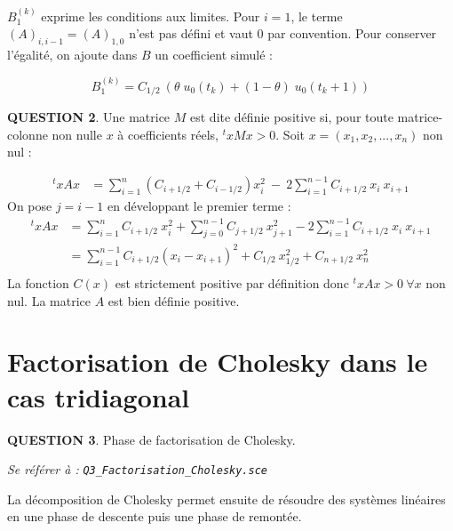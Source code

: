 \documentclass[a4paper,11pt]{article}
\newcommand{\quest}[1]{\small\textbf{#1}\normalsize}
\theoremstyle{nonumberplain}
\theoremstyle{nonumberplain}
\theoremstyle{nonumberplain}
\begin{document}
    $B_{1}^{(k)}$ exprime les conditions aux limites. Pour $i = 1$, le terme $(A)_{i, i - 1} = (A)_{1, 0}$
    n'est pas défini et vaut $0$ par convention. Pour conserver l'égalité, on ajoute dans $B$ un coefficient simulé :

      $$ B_1^{(k)} = C_{1/2}\ (\theta\;u_0(t_k) + (1-\theta)\;u_0(t_k+1)) $$

    \newpage
    \quest{QUESTION 2}. Une matrice $M$ est dite définie positive si, pour toute matrice-colonne non nulle $x$ à coefficients réels, $^txMx > 0$.
    Soit $x = (x_1, x_2, ... , x_n)$ non nul :

    \begin{calculs}
      \begin{equation*}
      \begin{split}
          ^txAx   & = \sum\limits_{i = 1}^{n} (C_{i+1/2} + C_{i-1/2}) x_i^2\ -\ 2 \sum\limits_{i = 1}^{n-1}C_{i+1/2}\ x_i\ x_{i+1}
      \end{split}
      \end{equation*}
      {\normalfont On pose} $j = i - 1$ {\normalfont en développant le premier terme :}
      \begin{equation}
      \begin{split}
          ^txAx   & = \sum\limits_{i = 1}^{n} C_{i+1/2}\ x_i^2 + \sum\limits_{j = 0}^{n-1} C_{j+1/2}\ x_{j+1}^2  - 2 \sum\limits_{i = 1}^{n-1} C_{i+1/2}\ x_i\ x_{i+1} \\
                  & = \sum\limits_{i = 1}^{n-1} C_{i+1/2} (x_i - x_{i+1})^2 + C_{1/2}\ x_{1/2}^2 + C_{n + 1/2}\ x_{n}^2 \\
      \end{split}
      \end{equation}
      {\normalfont La fonction} $C(x)$ {\normalfont est strictement positive par définition donc}
      $^txAx > 0\ \forall x$ {\normalfont non nul}.\newline
      {\normalfont La matrice $A$ est bien définie positive.}
    \end{calculs}

\smallskip
\section{Factorisation de Cholesky dans le cas tridiagonal}

    \quest{QUESTION 3}. Phase de factorisation de Cholesky.
    \begin{ref_scilab}
        \emph{Se référer à :} \texttt{\emph{Q3\_Factorisation\_Cholesky.sce}}
    \end{ref_scilab}
    La décomposition de Cholesky permet ensuite de résoudre des systèmes
    linéaires en une phase de descente puis une phase de remontée.
\end{document}
